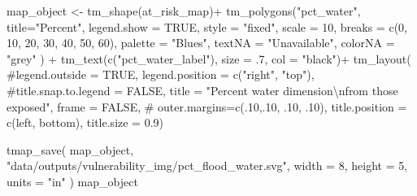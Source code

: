 \documentclass[
  letterpaper,
  DIV=11,
  numbers=noendperiod]{scrartcl}
\newenvironment{Shaded}{}{}
\newcommand{\AttributeTok}[1]{\textcolor[rgb]{0.84,0.23,0.29}{#1}}
\newcommand{\CommentTok}[1]{\textcolor[rgb]{0.42,0.45,0.49}{#1}}
\newcommand{\ConstantTok}[1]{\textcolor[rgb]{0.00,0.36,0.77}{#1}}
\newcommand{\DecValTok}[1]{\textcolor[rgb]{0.00,0.36,0.77}{#1}}
\newcommand{\FloatTok}[1]{\textcolor[rgb]{0.00,0.36,0.77}{#1}}
\newcommand{\FunctionTok}[1]{\textcolor[rgb]{0.44,0.26,0.76}{#1}}
\newcommand{\NormalTok}[1]{\textcolor[rgb]{0.14,0.16,0.18}{#1}}
\newcommand{\OtherTok}[1]{\textcolor[rgb]{0.44,0.26,0.76}{#1}}
\newcommand{\SpecialCharTok}[1]{\textcolor[rgb]{0.00,0.36,0.77}{#1}}
\newcommand{\StringTok}[1]{\textcolor[rgb]{0.01,0.18,0.38}{#1}}
\begin{document}
\begin{Shaded}
\begin{Highlighting}[]
\NormalTok{map\_object }\OtherTok{\textless{}{-}}
\FunctionTok{tm\_shape}\NormalTok{(at\_risk\_map)}\SpecialCharTok{+}
  \FunctionTok{tm\_polygons}\NormalTok{(}\StringTok{"pct\_water"}\NormalTok{,}
              \AttributeTok{title=}\StringTok{"Percent"}\NormalTok{, }
              \AttributeTok{legend.show =} \ConstantTok{TRUE}\NormalTok{,}
              \AttributeTok{style =} \StringTok{"fixed"}\NormalTok{,}
              \AttributeTok{scale =} \DecValTok{10}\NormalTok{,}
              \AttributeTok{breaks =} \FunctionTok{c}\NormalTok{(}\DecValTok{0}\NormalTok{, }\DecValTok{10}\NormalTok{, }\DecValTok{20}\NormalTok{, }\DecValTok{30}\NormalTok{, }\DecValTok{40}\NormalTok{, }\DecValTok{50}\NormalTok{, }\DecValTok{60}\NormalTok{),}
              \AttributeTok{palette =} \StringTok{"Blues"}\NormalTok{,}
              \AttributeTok{textNA =} \StringTok{"Unavailable"}\NormalTok{,}
              \AttributeTok{colorNA =} \StringTok{"grey"}
\NormalTok{              ) }\SpecialCharTok{+}
  \FunctionTok{tm\_text}\NormalTok{(}\FunctionTok{c}\NormalTok{(}\StringTok{"pct\_water\_label"}\NormalTok{), }\AttributeTok{size =}\NormalTok{ .}\DecValTok{7}\NormalTok{, }\AttributeTok{col =} \StringTok{"black"}\NormalTok{)}\SpecialCharTok{+}
  \FunctionTok{tm\_layout}\NormalTok{(}
    \CommentTok{\#legend.outside = TRUE,}
    \AttributeTok{legend.position =} \FunctionTok{c}\NormalTok{(}\StringTok{"right"}\NormalTok{, }\StringTok{"top"}\NormalTok{),}
    \CommentTok{\#title.snap.to.legend = FALSE,}
    \AttributeTok{title =} 
      \StringTok{"Percent water dimension}\SpecialCharTok{\textbackslash{}n}\StringTok{from those exposed"}\NormalTok{,}
    \AttributeTok{frame =} \ConstantTok{FALSE}\NormalTok{,}
\CommentTok{\#            outer.margins=c(.10,.10, .10, .10), }
            \AttributeTok{title.position =} \FunctionTok{c}\NormalTok{(}\StringTok{\textquotesingle{}left\textquotesingle{}}\NormalTok{, }\StringTok{\textquotesingle{}bottom\textquotesingle{}}\NormalTok{),}
            \AttributeTok{title.size =} \FloatTok{0.9}\NormalTok{)}

\FunctionTok{tmap\_save}\NormalTok{(}
\NormalTok{  map\_object,}
  \StringTok{"data/outputs/vulnerability\_img/pct\_flood\_water.svg"}\NormalTok{,}
  \AttributeTok{width =} \DecValTok{8}\NormalTok{,}
  \AttributeTok{height =} \DecValTok{5}\NormalTok{,}
  \AttributeTok{units =} \StringTok{"in"}
\NormalTok{)}
\NormalTok{map\_object}
\end{Highlighting}
\end{Shaded}
\end{document}
